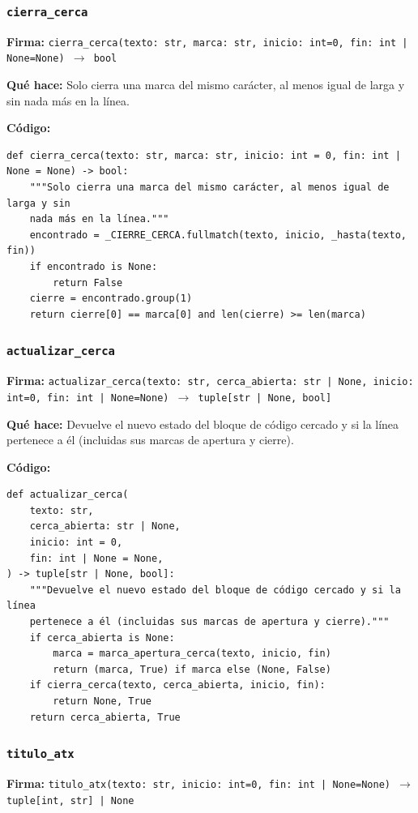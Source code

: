 \documentclass[11pt,a4paper]{article}
\begin{document}
\subsubsection*{\texttt{cierra\_cerca}}
\textbf{Firma:} \texttt{cierra\_cerca(texto: str, marca: str, inicio: int=0, fin: int | None=None) $\rightarrow$ bool}

\textbf{Qué hace:} Solo cierra una marca del mismo carácter, al menos igual de larga y sin
nada más en la línea.

\textbf{Código:}
\begin{lstlisting}
def cierra_cerca(texto: str, marca: str, inicio: int = 0, fin: int | None = None) -> bool:
    """Solo cierra una marca del mismo carácter, al menos igual de larga y sin
    nada más en la línea."""
    encontrado = _CIERRE_CERCA.fullmatch(texto, inicio, _hasta(texto, fin))
    if encontrado is None:
        return False
    cierre = encontrado.group(1)
    return cierre[0] == marca[0] and len(cierre) >= len(marca)
\end{lstlisting}

\subsubsection*{\texttt{actualizar\_cerca}}
\textbf{Firma:} \texttt{actualizar\_cerca(texto: str, cerca\_abierta: str | None, inicio: int=0, fin: int | None=None) $\rightarrow$ tuple[str | None, bool]}

\textbf{Qué hace:} Devuelve el nuevo estado del bloque de código cercado y si la línea
pertenece a él (incluidas sus marcas de apertura y cierre).

\textbf{Código:}
\begin{lstlisting}
def actualizar_cerca(
    texto: str,
    cerca_abierta: str | None,
    inicio: int = 0,
    fin: int | None = None,
) -> tuple[str | None, bool]:
    """Devuelve el nuevo estado del bloque de código cercado y si la línea
    pertenece a él (incluidas sus marcas de apertura y cierre)."""
    if cerca_abierta is None:
        marca = marca_apertura_cerca(texto, inicio, fin)
        return (marca, True) if marca else (None, False)
    if cierra_cerca(texto, cerca_abierta, inicio, fin):
        return None, True
    return cerca_abierta, True
\end{lstlisting}

\subsubsection*{\texttt{titulo\_atx}}
\textbf{Firma:} \texttt{titulo\_atx(texto: str, inicio: int=0, fin: int | None=None) $\rightarrow$ tuple[int, str] | None}
\end{document}
